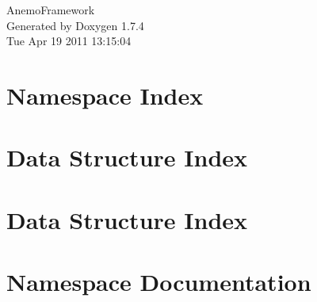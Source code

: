\documentclass[a4paper]{book}
\begin{document}
\hypersetup{pageanchor=false}
\begin{titlepage}
\vspace*{7cm}
\begin{center}
{\Large AnemoFramework }\\
\vspace*{1cm}
{\large Generated by Doxygen 1.7.4}\\
\vspace*{0.5cm}
{\small Tue Apr 19 2011 13:15:04}\\
\end{center}
\end{titlepage}
\clearemptydoublepage
{}
\tableofcontents
\clearemptydoublepage
{}
\hypersetup{pageanchor=true}
\chapter{Namespace Index}

\chapter{Data Structure Index}

\chapter{Data Structure Index}

\chapter{Namespace Documentation}



















\end{document}
